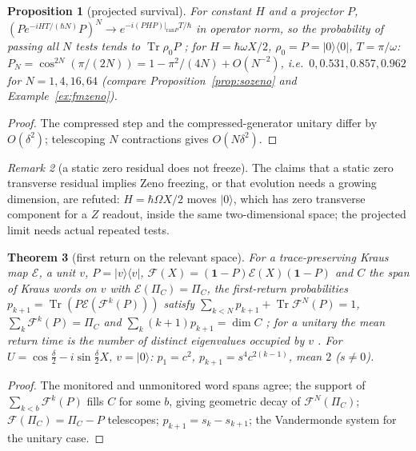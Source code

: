 \documentclass[aps,pra,onecolumn,superscriptaddress,nofootinbib,10pt]{revtex4-2}
\newtheorem{theorem}{Theorem}
\newtheorem{proposition}[theorem]{Proposition}
\theoremstyle{definition}
\theoremstyle{remark}
\newtheorem{remark}[theorem]{Remark}
\newcommand{\tr}{\operatorname{Tr}}
\begin{document}
\begin{proposition}[projected survival]\label{prop:bdzeno}
For constant $H$ and a projector $P$, $(Pe^{-iHT/(\hbar N)}P)^N\to e^{-i(PHP)|_{\mathrm{ran}P}T/\hbar}$ in operator norm, so the probability of passing all $N$ tests tends to
$\tr\rho_0P$ \cite{n3:Zeno}; for $H=\hbar\omega X/2$, $\rho_0=P=\lvert0\rangle\langle0\rvert$, $T=\pi/\omega$: $P_N=\cos^{2N}(\pi/(2N))=1-\pi^2/(4N)+O(N^{-2})$, i.e.\ $0,0.531,0.857,0.962$
for $N=1,4,16,64$ (compare Proposition~\ref{prop:sozeno} and Example~\ref{ex:fmzeno}).
\end{proposition}
\begin{proof}
The compressed step and the compressed-generator unitary differ by $O(\delta^2)$; telescoping $N$ contractions gives $O(N\delta^2)$.
\end{proof}
\begin{remark}[a static zero residual does not freeze]\label{rem:bdnofreeze}
The claims that a static zero transverse residual implies Zeno freezing, or that evolution needs a
growing dimension, are refuted: $H=\hbar\Omega X/2$ moves $\lvert0\rangle$, which has zero transverse component for a $Z$ readout, inside the
same two-dimensional space; the projected limit needs actual repeated tests.
\end{remark}

\begin{theorem}[first return on the relevant space]\label{thm:bdkac}
For a trace-preserving Kraus map $\mathcal E$, a unit $v$, $P=\lvert v\rangle\langle v\rvert$, $\mathcal F(X)=(\mathbf1-P)\mathcal E(X)(\mathbf1-P)$ and $C$ the span of Kraus words on $v$ with $\mathcal E(\Pi_C)=\Pi_C$, the
first-return probabilities $p_{k+1}=\tr(P\mathcal E(\mathcal F^k(P)))$ satisfy $\sum_{k<N}p_{k+1}+\tr\mathcal F^N(P)=1$, $\sum_k\mathcal F^k(P)=\Pi_C$ and $\sum_k(k+1)p_{k+1}=\dim C$
\cite{n4:SKKA,n4:SKA}; for a unitary the mean return time is the number of distinct eigenvalues occupied by $v$
\cite[Thm.~2]{n4:GVWW}.  For $U=\cos\tfrac\delta2-i\sin\tfrac\delta2X$, $v=\lvert0\rangle$: $p_1=c^2$, $p_{k+1}=s^4c^{2(k-1)}$, mean $2$ ($s\ne0$).
\end{theorem}
\begin{proof}
The monitored and unmonitored word spans agree; the support of $\sum_{k<b}\mathcal F^k(P)$ fills $C$ for some $b$, giving geometric decay of
$\mathcal F^N(\Pi_C)$; $\mathcal F(\Pi_C)=\Pi_C-P$ telescopes; $p_{k+1}=s_k-s_{k+1}$; the Vandermonde system for the unitary case.
\end{proof}
\end{document}
